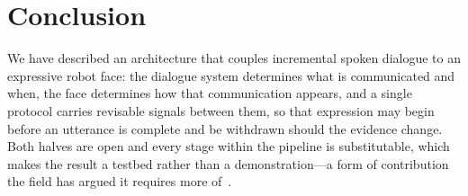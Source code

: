\section{Conclusion}

%
%

We have described an architecture that couples incremental spoken dialogue to
an expressive robot face: the dialogue system determines what is communicated
and when, the face determines how that communication appears, and a single
protocol carries revisable signals between them, so that expression may begin
before an utterance is complete and be withdrawn should the evidence change.
Both halves are open and every stage within the pipeline is substitutable,
which makes the result a testbed rather than a demonstration---a form of
contribution the field has argued it requires more
of~\cite{gunes2022reproducibility}.






